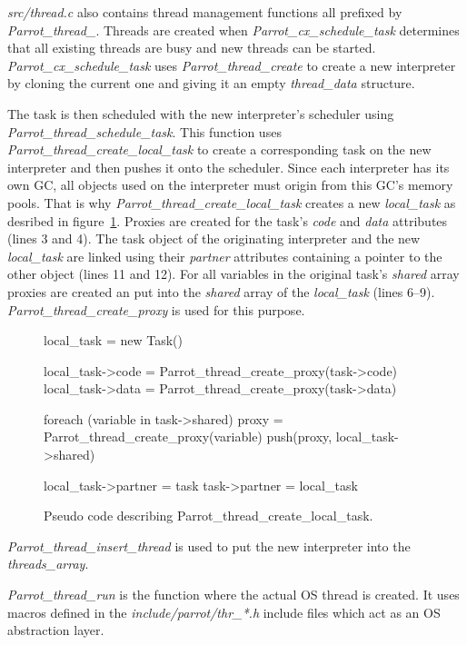\documentclass[bachelor,english]{hgbthesis}
\begin{document}
\textit{src/thread.c} also contains thread management functions all prefixed by \textit{Parrot\_thread\_}. Threads are created when \textit{Parrot\_cx\_schedule\_task} determines that all existing threads are busy and new threads can be started. \textit{Parrot\_cx\_schedule\_task} uses \textit{Parrot\_thread\_create} to create a new interpreter by cloning the current one and giving it an empty \textit{thread\_data} structure.

The task is then scheduled with the new interpreter's scheduler using \textit{Parrot\_thread\_schedule\_task}. This function uses \textit{Parrot\_\-thread\_\-create\_\-local\_\-task} to create a corresponding task on the new interpreter and then pushes it onto the scheduler. Since each interpreter has its own GC, all objects used on the interpreter must origin from this GC's memory pools. That is why \textit{Parrot\_thread\_create\_local\_task} creates a new \textit{local\_task} as desribed in figure~\ref{fig:createlocaltask}. Proxies are created for the task's \textit{code} and \textit{data} attributes (lines 3 and 4). The task object of the originating interpreter and the new \textit{local\_task} are linked using their \textit{partner} attributes containing a pointer to the other object (lines 11 and 12). For all variables in the original task's \textit{shared} array proxies are created an put into the \textit{shared} array of the \textit{local\_task} (lines 6--9). \textit{Parrot\_thread\_create\_proxy} is used for this purpose.

\begin{figure}
\centering
\begin{GenericCode}
local_task = new Task()

local_task->code = Parrot_thread_create_proxy(task->code)
local_task->data = Parrot_thread_create_proxy(task->data)

foreach (variable in task->shared) {
    proxy = Parrot_thread_create_proxy(variable)
    push(proxy, local_task->shared)
}

local_task->partner = task
task->partner = local_task
\end{GenericCode}
\caption{Pseudo code describing Parrot\_thread\_create\_local\_task.}
\label{fig:createlocaltask}
\end{figure}

\textit{Parrot\_thread\_insert\_thread} is used to put the new interpreter into the \textit{threads\_array}.

\textit{Parrot\_thread\_run} is the function where the actual OS thread is created. It uses macros defined in the \textit{include/parrot/thr\_*.h} include files which act as an OS abstraction layer.
\end{document}
